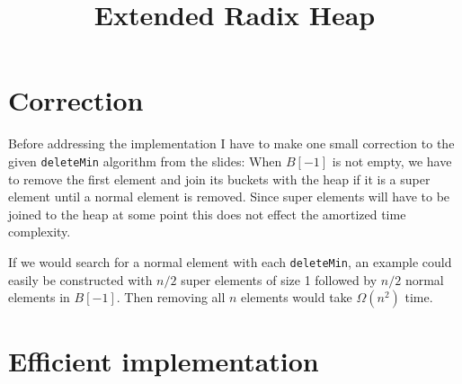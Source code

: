\documentclass[10pt, a4paper]{article}
\title{Extended Radix Heap}
\date{}
\begin{document}
\maketitle

\section{Correction}

Before addressing the implementation I have to make one small correction to the given \texttt{deleteMin} algorithm from the slides: When $B[-1]$ is not empty, we have to remove the first element and join its buckets with the heap if it is a super element until a normal element is removed. Since super elements will have to be joined to the heap at some point this does not effect the amortized time complexity.

If we would search for a normal element with each \texttt{deleteMin}, an example could easily be constructed with $n/2$ super elements of size 1 followed by $n/2$ normal elements in $B[-1]$. Then removing all $n$ elements would take $\Omega(n^2)$ time. 

\section{Efficient implementation}
\end{document}
